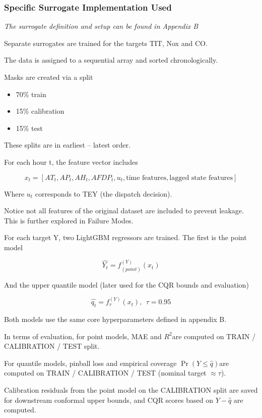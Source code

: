 \documentclass[11pt]{article}
\begin{document}
\subsubsection{Specific Surrogate Implementation
Used}\label{specific-surrogate-implementation-used}

\emph{The surrogate definition and setup can be found in Appendix B}

Separate surrogates are trained for the targets TIT, Nox and CO.

The data is assigned to a sequential array and sorted chronologically.

Masks are created via a split

\begin{itemize}
\item
  70\% train
\item
  15\% calibration
\item
  15\% test
\end{itemize}

These splits are in earliest -- latest order.

For each hour t, the feature vector includes

\[x_{t} = \left\lbrack AT_{t},AP_{t},AH_{t},AFDP_{t},u_{t},\text{time features},\text{lagged state features} \right\rbrack\]

Where \(u_{t}\) corresponds to TEY (the dispatch decision).

Notice not all features of the original dataset are included to prevent
leakage. This is further explored in Failure Modes.

For each target Y, two LightGBM regressors are trained. The first is the
point model

\[\widehat{Y_{t}} = f_{(point)}^{(Y)}\left( x_{t} \right)\]

And the upper quantile model (later used for the CQR bounds and
evaluation)

\[\widehat{q_{t}} = f_{\tau}^{(Y)}\left( x_{t} \right),\ \ \tau = 0.95\]

Both models use the same core hyperparameters defined in appendix B.

In terms of evaluation, for point models, MAE and \(R^{2}\)are computed
on TRAIN / CALIBRATION / TEST split.

For quantile models, pinball loss and empirical coverage
\(\Pr(Y \leq \widehat{q})\)are computed on TRAIN / CALIBRATION / TEST
(nominal target \(\approx \tau\)).

Calibration residuals from the point model on the CALIBRATION split are
saved for downstream conformal upper bounds, and CQR scores based on
\(Y - \widehat{q}\) are computed.
\end{document}

